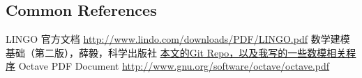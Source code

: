 \documentclass[12pt,a4paper]{article} \usepackage{kurier}
\begin{document}
\begin{CJK}{UTF8}{gkai}
\newpage
\section{Common References}
\begin{thebibliography}{9}
 LINGO 官方文档 \url{http://www.lindo.com/downloads/PDF/LINGO.pdf}
\bibitem{} 数学建模基础（第二版），薛毅，科学出版社
\bibitem{} \href{https://github.com/CDLuminate/mathmod}{本文的Git Repo，以及我写的一些数模相关程序}
 Octave PDF Document \url{http://www.gnu.org/software/octave/octave.pdf}
\end{thebibliography}

\end{CJK}
\end{document}
